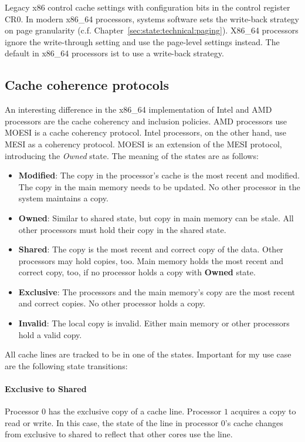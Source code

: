 Legacy x86 control cache settings with configuration bits in the control
register CR0. In modern x86\_64 processors, systems software sets the write-back
strategy on page granularity (c.f. Chapter~\ref{sec:state:technical:paging}).
X86\_64 processors ignore the write-through setting and use the page-level
settings instead. \cite{amd_manual} The default in x86\_64 processors ist to use
a write-back strategy.

\subsection{Cache coherence protocols}
\label{sec:state:technical:caches_protocol}
An interesting difference in the x86\_64 implementation of Intel and AMD
processors are the cache coherency and inclusion policies. AMD processors use
MOESI is a cache coherency protocol.\cite{amd_manual} Intel processors, on the
other hand, use MESI as a coherency protocol.\cite{intel_sdm} MOESI is an
extension of the MESI protocol, introducing the \textit{Owned} state. The
meaning of the states are as follows:
\begin{itemize}
    \item \textbf{Modified}: The copy in the processor's cache is the most
          recent and modified. The copy in the main memory needs to be updated.
          No other processor in the system maintains a copy.
    \item \textbf{Owned}: Similar to shared state, but copy in main memory can
          be stale. All other processors must hold their copy in the shared
          state.
    \item \textbf{Shared}:  The copy is the most recent and correct copy of the
          data. Other processors may hold copies, too. Main memory holds the
          most recent and correct copy, too, if no processor holds a copy with
          \textbf{Owned} state.
    \item \textbf{Exclusive}: The processors and the main memory's copy are the
          most recent and correct copies. No other processor holds a copy.
    \item \textbf{Invalid}: The local copy is invalid. Either main memory or
          other processors hold a valid copy.
\end{itemize}
All cache lines are tracked to be in one of the states. Important for my use
case are the following state transitions:

\paragraph{Exclusive to Shared}
Processor $0$ has the exclusive copy of a cache line. Processor $1$ acquires a
copy to read or write. In this case, the state of the line in processor $0$'s
cache changes from exclusive to shared to reflect that other cores use the line.

